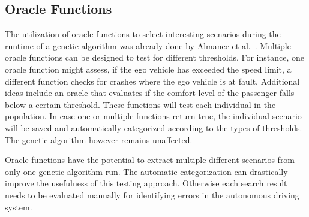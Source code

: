 \subsection{Oracle Functions}
The utilization of oracle functions to select interesting scenarios during the runtime of a genetic algorithm was already done by Almanee et al.~\cite{almanee_scenorita_2021}. Multiple oracle functions can be designed to test for different thresholds. For instance, one oracle function might assess, if the ego vehicle has exceeded the speed limit, a different function checks for crashes where the ego vehicle is at fault. Additional ideas include an oracle that evaluates if the comfort level of the passenger falls below a certain threshold. These functions will test each individual in the population. In case one or multiple functions return true, the individual scenario will be saved and automatically categorized according to the types of thresholds. The genetic algorithm however remains unaffected.

Oracle functions have the potential to extract multiple different scenarios from only one genetic algorithm run. The automatic categorization can drastically improve the usefulness of this testing approach. Otherwise each search result needs to be evaluated manually for identifying errors in the autonomous driving system.
